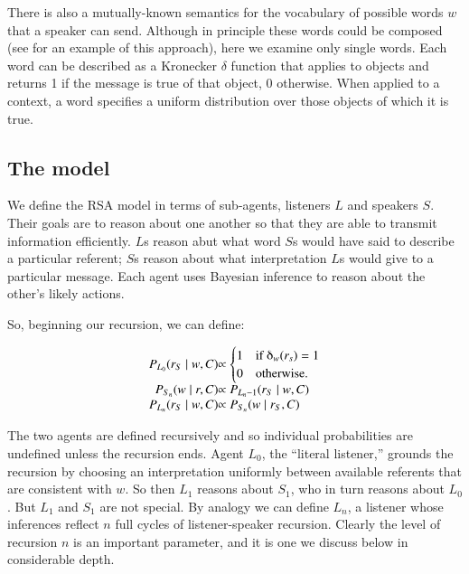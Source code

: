There is also a mutually-known semantics for the vocabulary of possible words $w$ that a speaker can send. Although in principle these words could be composed (see  for an example of this approach), here we examine only single words. Each word can be described as a Kronecker $\delta$ function that applies to objects and returns 1 if the message is true of that object, 0 otherwise. When applied to a context, a word specifies a uniform distribution over those objects of which it is true. 

\subsection{The model}

We define the RSA model in terms of sub-agents, listeners $L$ and speakers $S$. Their goals are to reason about one another so that they are able to transmit information efficiently. $L$s reason abut what word $S$s would have said to describe a particular referent; $S$s reason about what interpretation $L$s would give to a particular message. Each agent uses Bayesian inference to reason about the other's likely actions. 

So, beginning our recursion, we can define:

\begin{equation}
  \begin{array}{r@{}l}
    \label{eq:agents}
    P_{L_0}(r_S \mid w, C) & \propto \begin{cases} 1 &\mbox{if } \delta_w(r_s) = 1 \\ 
0 & \mbox{otherwise.} \end{cases} \\
    P_{S_n}(w \mid r, C) & \propto P_{L_n-1} (r_S \mid w, C)  \\
    P_{L_n}(r_S \mid w, C) & \propto P_{S_n} (w \mid r_S, C)\\
  \end{array}
\end{equation}

The two agents are defined recursively and so individual probabilities are undefined unless the recursion ends.  Agent $L_0$, the ``literal listener,'' grounds the recursion by choosing an interpretation uniformly between available referents that are consistent with $w$. So then $L_1$ reasons about $S_1$, who in turn reasons about $L_0$. But $L_1$ and $S_1$ are not special. By analogy we can define $L_n$, a listener whose inferences reflect $n$ full cycles of listener-speaker recursion. Clearly the level of recursion $n$ is an important parameter, and it is one we discuss below in considerable depth. 

